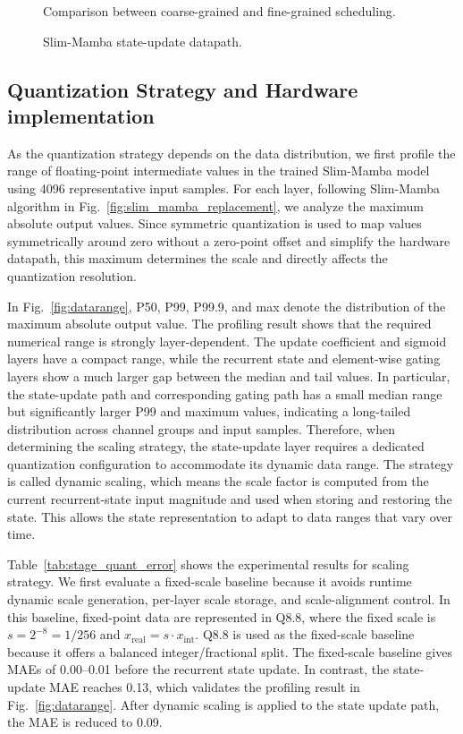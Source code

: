 \documentclass[lettersize,journal]{IEEEtran}
\begin{document}
\begin{figure}[!t]
\centering

\caption{Comparison between coarse-grained and fine-grained scheduling.}
\label{fig:fine_grained_pipeline}
\end{figure}

\begin{figure}[!t]
\centering

\caption{Slim-Mamba state-update datapath.}
\label{fig:ssm_path}
\end{figure}

\subsection{Quantization Strategy and Hardware implementation}

As the quantization strategy depends on the data distribution, we first profile the range of floating-point intermediate values in the trained Slim-Mamba model using 4096 representative input samples. For each layer, following Slim-Mamba algorithm in Fig.~\ref{fig:slim_mamba_replacement}, we analyze the maximum absolute output values. Since symmetric quantization is used to map values symmetrically around zero without a zero-point offset and simplify the hardware datapath, this maximum determines the scale and directly affects the quantization resolution. 

In Fig.~\ref{fig:datarange}, P50, P99, P99.9, and max denote the distribution of the maximum absolute output value. The profiling result shows that the required numerical range is strongly
layer-dependent. The update coefficient and sigmoid layers have a compact range,
while the recurrent state and element-wise gating layers show a much larger gap
between the median and tail values. In particular, the state-update path and corresponding gating path has a
small median range but significantly larger P99 and maximum values, indicating a
long-tailed distribution across channel groups and input samples. Therefore, when determining the scaling strategy, the state-update layer requires
a dedicated quantization configuration to accommodate its dynamic data range. The strategy is called dynamic scaling, which means the scale factor is computed from the current recurrent-state input magnitude and used when storing and restoring the state. This allows the state representation to adapt to data ranges that vary over
time.

Table~\ref{tab:stage_quant_error} shows the experimental results for scaling strategy. We first evaluate a fixed-scale baseline because it avoids runtime dynamic scale
generation, per-layer scale storage, and scale-alignment control. In this baseline, fixed-point data are represented in Q8.8,
where the fixed scale is \(s=2^{-8}=1/256\) and
\(x_{\mathrm{real}}=s\cdot x_{\mathrm{int}}\). Q8.8 is used as the fixed-scale baseline because it 
offers a balanced integer/fractional split.
The fixed-scale baseline gives MAEs of 0.00--0.01 before the recurrent
state update. In contrast, the state-update MAE reaches
0.13, which validates the profiling result in Fig.~\ref{fig:datarange}. After dynamic scaling is applied to the state update path, the
MAE is reduced to 0.09.
\end{document}
